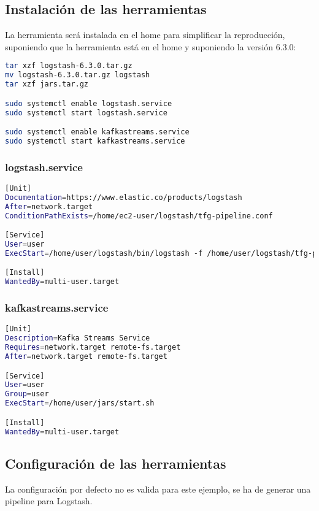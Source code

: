 \subsection{Instalación de las herramientas}
La herramienta será instalada en el home para simplificar la reproducción, suponiendo que la herramienta está en el home y suponiendo la versión 6.3.0:
\begin{lstlisting}[language=Bash]
tar xzf logstash-6.3.0.tar.gz
mv logstash-6.3.0.tar.gz logstash
tar xzf jars.tar.gz

sudo systemctl enable logstash.service
sudo systemctl start logstash.service

sudo systemctl enable kafkastreams.service
sudo systemctl start kafkastreams.service
\end{lstlisting}
\subsubsection{logstash.service}
\begin{lstlisting}[language=Bash]
[Unit]
Documentation=https://www.elastic.co/products/logstash
After=network.target
ConditionPathExists=/home/ec2-user/logstash/tfg-pipeline.conf

[Service]
User=user
ExecStart=/home/user/logstash/bin/logstash -f /home/user/logstash/tfg-pipeline.conf --config.reload.automatic

[Install]
WantedBy=multi-user.target
\end{lstlisting}

\subsubsection{kafkastreams.service}
\begin{lstlisting}[language=Bash]
[Unit]
Description=Kafka Streams Service
Requires=network.target remote-fs.target
After=network.target remote-fs.target

[Service]
User=user
Group=user
ExecStart=/home/user/jars/start.sh

[Install]
WantedBy=multi-user.target
\end{lstlisting}

\subsection{Configuración de las herramientas}
La configuración por defecto no es valida para este ejemplo, se ha de generar una pipeline para Logstash.


